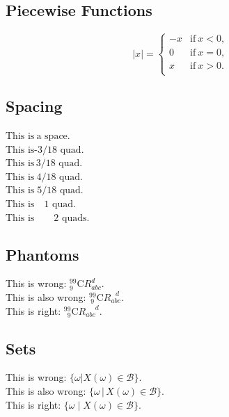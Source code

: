 \documentclass[a4paper,10pt]{article}
\begin{document}
    \subsection{Piecewise Functions}
    \begin{equation*}
        |x| =
        \begin{cases}
            -x & \text{if} \  x < 0, \\
             0 & \text{if} \  x = 0, \\
             x & \text{if} \  x > 0. \\
        \end{cases}
    \end{equation*}
    \subsection{Spacing}
    $ \text{This is} \  \text{a space.} $ \\
    $ \text{This is} \! \text{-3/18 quad.} $ \\
    $ \text{This is} \, \text{3/18 quad.} $ \\
    $ \text{This is} \: \text{4/18 quad.} $ \\
    $ \text{This is} \; \text{5/18 quad.} $ \\
    $ \text{This is} \quad \text{1 quad.} $ \\
    $ \text{This is} \qquad \text{2 quads.} $
    \subsection{Phantoms}
    This is wrong: ${}^{99}_{ 9}\text{C}R_{abc}^{   d}$.\\
    This is also wrong: ${}^{99}_{\ 9}\text{C}R_{abc}^{\ \ \ d}$.\\
    This is right: ${}^{99}_{\phantom{9}9}\text{C}R_{abc}^{\phantom{abc}d}$.
    \subsection{Sets}
    This is wrong: $\{\omega|X(\omega)\in\mathcal{B}\}$.\\
    This is also wrong: $\{\omega\,|\,X(\omega)\in\mathcal{B}\}$.\\
    This is right: $\{\omega\mid X(\omega)\in\mathcal{B}\}$.\\
\end{document}
